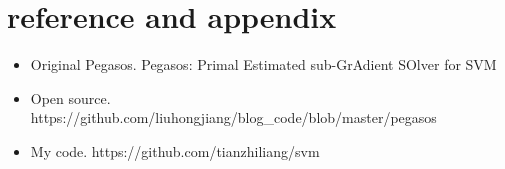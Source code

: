 \documentclass[11pt]{article}
\begin{document}
\section{reference and appendix}
\begin{itemize}
\item Original Pegasos. Pegasos: Primal Estimated sub-GrAdient SOlver for SVM
\item Open source. https://github.com/liuhongjiang/blog\_code/blob/master/pegasos
\item My code. https://github.com/tianzhiliang/svm
\end{itemize}
\end{document}
